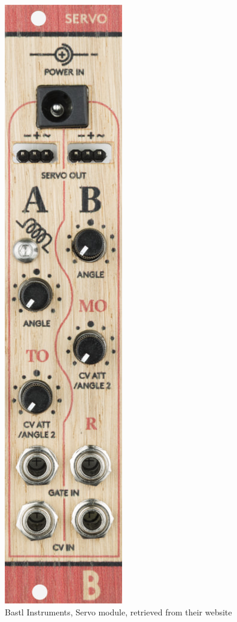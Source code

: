 \begin{figure}[h]
  \centering
  \includegraphics[width=0.75\linewidth,height=0.25\textheight,keepaspectratio]{images/bastl-servo.jpg}
  \caption{Bastl Instruments, Servo module, retrieved from their website}
  \label{fig:bastl-servo}
\end{figure}

